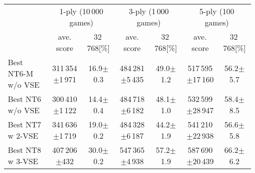 \documentclass[runningheads]{llncs}
\begin{document}
\setlength{\doublerulesep}{.4pt}
 \small\begin{tabular}{l|c|c|c|c|c|c}
  \hline \hline
  & \multicolumn{2}{c|}{1-ply (10\,000 games)} & \multicolumn{2}{c|}{3-ply (1\,000 games)} & \multicolumn{2}{c}{5-ply (100 games)} \\
  & \multicolumn{1}{c}{ave. score} & 32\,768[\%] & \multicolumn{1}{c}{ave. score} & 32\,768[\%] & \multicolumn{1}{c}{ave. score} & 32\,768[\%] \\
  \hline
   Best \textsf{NT6-M} w/o VSE	& 311\,354$\pm$1\,971		& 16.9$\pm$0.3	& 484\,281$\pm$5\,435	& 49.0$\pm$1.2	& 517\,595$\pm$17\,160	& 56.2$\pm$5.7 \\\hline
   Best \textsf{NT6} w/o VSE	& 300\,410$\pm$1\,122		& 14.4$\pm$0.4	& 484\,718$\pm$6\,182	& 48.1$\pm$1.0	& 532\,599$\pm$28\,947	& 58.4$\pm$8.5 \\\hline
   Best \textsf{NT7} w 2-VSE	& 341\,636$\pm$1\,719		& 19.0$\pm$0.2	& 484\,328$\pm$6\,187	& 44.2$\pm$1.9	& 541\,210$\pm$22\,938	& 56.6$\pm$5.8 \\\hline
   Best \textsf{NT8} w 3-VSE	& 407\,206$\pm$\phantom{1\,}432 & 30.0$\pm$0.2	& 547\,365$\pm$4\,938	& 57.2$\pm$1.9	& 587\,690$\pm$20\,439	& 66.2$\pm$6.2 \\\hline
 \end{tabular}
\end{document}
